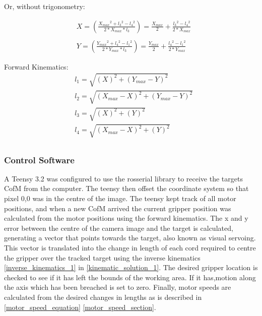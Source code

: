 \documentclass[conference]{IEEEtran}
\begin{document}
Or, without trigonometry:

\begin{equation} \label{inverse_kinematics_1}
\begin{aligned}
&X = \left(\frac{X_{max}{}^2 + l_3{}^2 - l_4{}^2}{2*X_{max}*l_3}\right) = \frac{X_{max}}{2} + \frac{l_3{}^2 - l_4{}^2}{2*X_{max}}\\ \\
&Y = \left(\frac{Y_{max}{}^2 + l_4{}^2 - l_1{}^2}{2*Y_{max}*l_3}\right) = \frac{Y_{max}}{2} + \frac{l_4{}^2 - l_1{}^2}{2*Y_{max}}
\end{aligned}
\end{equation}

Forward Kinematics:
\begin{equation} \label{forward_kinematics_1}
\begin{aligned}
&l_1 = \sqrt{\left(X\right)^2 + \left(Y_{max}-Y\right)^2}\\
&l_2 = \sqrt{\left(X_{max}-X\right)^2 + \left(Y_{max}-Y\right)^2}\\
&l_3 = \sqrt{\left(X\right)^2 + \left(Y\right)^2}\\
&l_4 = \sqrt{\left(X_{max}-X\right)^2 + \left(Y\right)^2}\\
\end{aligned}
\end{equation}

\subsubsection{Control Software}
A Teensy 3.2 was configured to use the rosserial library to receive the targets CofM from the computer. The teensy then offset the coordinate system so that pixel 0,0 was in the centre of the image. The teensy kept track of all motor positions, and when a new CofM arrived the current gripper position was calculated from the motor positions using the forward kinematics. The x and y error between the centre of the camera image and the target is calculated, generating a vector that points towards the target, also known as visual servoing. This vector is translated into the change in length of each cord required to centre the gripper over the tracked target using the inverse kinematics \ref{inverse_kinematics_1} in \ref{kinematic_solution_1}. The desired gripper location is checked to see if it has left the bounds of the working area. If it has,motion along the axis which has been breached is set to zero. Finally, motor speeds are calculated from the desired changes in lengths as is described in \ref{motor_speed_equation} \ref{motor_speed_section}.
\end{document}
